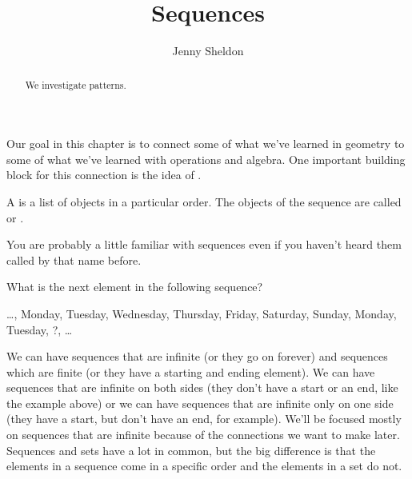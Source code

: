 \documentclass{ximera}
\title{Sequences}
\author{Jenny Sheldon}
\begin{document}
\begin{abstract}
We investigate patterns.
\end{abstract}
\maketitle

Our goal in this chapter is to connect some of what we've learned in geometry to some of what we've learned with operations and algebra. One important building block for this connection is the idea of .

\begin{definition}
A  is a list of objects in a particular order. The objects of the sequence are called  or .
\end{definition}

You are probably a little familiar with sequences even if you haven't heard them called by that name before.

\begin{question}
What is the next element in the following sequence?

\begin{center}
\dots, Monday, Tuesday, Wednesday, Thursday, Friday, Saturday, Sunday, Monday, Tuesday, ?, \dots
\end{center}

\begin{multipleChoice}
\end{multipleChoice}
\end{question}

We can have sequences that are infinite (or they go on forever) and sequences which are finite (or they have a starting and ending element). We can have sequences that are infinite on both sides (they don't have a start or an end, like the example above) or we can have sequences that are infinite only on one side (they have a start, but don't have an end, for example). We'll be focused mostly on sequences that are infinite because of the connections we want to make later. Sequences and sets have a lot in common, but the big difference is that the elements in a sequence come in a specific order and the elements in a set do not.
\end{document}
